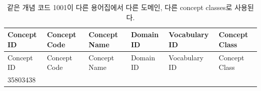 \documentclass[11pt]{book}
\theoremstyle{definition}
\theoremstyle{definition}
\theoremstyle{definition}
\theoremstyle{remark}
\begin{document}
\begin{longtable}[]{@{}llllll@{}}
\caption{\label{tab:code1001} 같은 개념 코드 1001이 다른 용어집에서 다른
도메인, 다른 concept classes로 사용된다.}\tabularnewline
\toprule
\begin{minipage}[b]{0.13\columnwidth}\raggedright\strut
Concept ID\strut
\end{minipage} & \begin{minipage}[b]{0.07\columnwidth}\raggedright\strut
Concept Code\strut
\end{minipage} & \begin{minipage}[b]{0.16\columnwidth}\raggedright\strut
Concept Name\strut
\end{minipage} & \begin{minipage}[b]{0.14\columnwidth}\raggedright\strut
Domain ID\strut
\end{minipage} & \begin{minipage}[b]{0.14\columnwidth}\raggedright\strut
Vocabulary ID\strut
\end{minipage} & \begin{minipage}[b]{0.14\columnwidth}\raggedright\strut
Concept Class\strut
\end{minipage}\tabularnewline
\midrule
\endfirsthead
\toprule
\begin{minipage}[b]{0.13\columnwidth}\raggedright\strut
Concept ID\strut
\end{minipage} & \begin{minipage}[b]{0.07\columnwidth}\raggedright\strut
Concept Code\strut
\end{minipage} & \begin{minipage}[b]{0.16\columnwidth}\raggedright\strut
Concept Name\strut
\end{minipage} & \begin{minipage}[b]{0.14\columnwidth}\raggedright\strut
Domain ID\strut
\end{minipage} & \begin{minipage}[b]{0.14\columnwidth}\raggedright\strut
Vocabulary ID\strut
\end{minipage} & \begin{minipage}[b]{0.14\columnwidth}\raggedright\strut
Concept Class\strut
\end{minipage}\tabularnewline
\midrule
\endhead
\begin{minipage}[t]{0.13\columnwidth}\raggedright\strut
35803438\strut
\end{minipage} & \begin{minipage}[t]{0.07\columnwidth}\raggedright\strut

\end{minipage}
\end{longtable}
\end{document}
